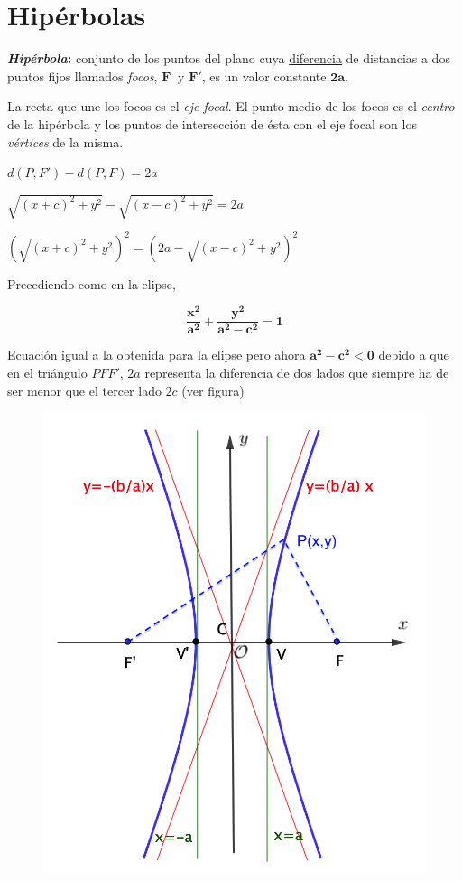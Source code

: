 \vspace{5mm}
\section{Hipérbolas}
\vspace{-5mm}
\vspace{0.5cm}

\begin{definition}[ Hipérbola]
	
	\textbf{\emph{Hipérbola}:} conjunto de los puntos del plano cuya \underline{diferencia} de distancias a dos puntos fijos llamados \emph{focos}, $\boldsymbol F\ \text{ y } \boldsymbol{F'}$, es un valor constante $\boldsymbol{2a}$.
\end{definition}


La recta que une los focos es el \emph{eje focal}. El punto medio de los focos es el \emph{centro} de la hipérbola y los puntos de intersección de ésta con el eje focal son los \emph{vértices} de la misma.

\vspace{4mm}
\begin{multicols}{2}
$d(P,F')-d(P,F)=2a$

$\sqrt{(x+c)^2+y^2}-\sqrt{(x-c)^2+y^2}=2a$

$\left(\sqrt{(x+c)^2+y^2}\right)^2=\left(2a-\sqrt{(x-c)^2+y^2}\right)^2$

Precediendo como en la elipse,

$$ \boldsymbol{ \dfrac{x^2}{a^2}+\dfrac{y^2}{a^2-c^2}=1 } $$

Ecuación igual a la obtenida para la elipse pero ahora $\boldsymbol{a^2-c^2<0}$ debido a que en el triángulo $PFF'$, $2a$ representa la diferencia de dos lados que siempre ha de ser menor que el tercer lado $2c$ (ver figura)
	\begin{figure}[H]
	\centering
	\includegraphics[width=.4\textwidth]{img-conicas/conicas11.png}
	\end{figure}
\end{multicols}

